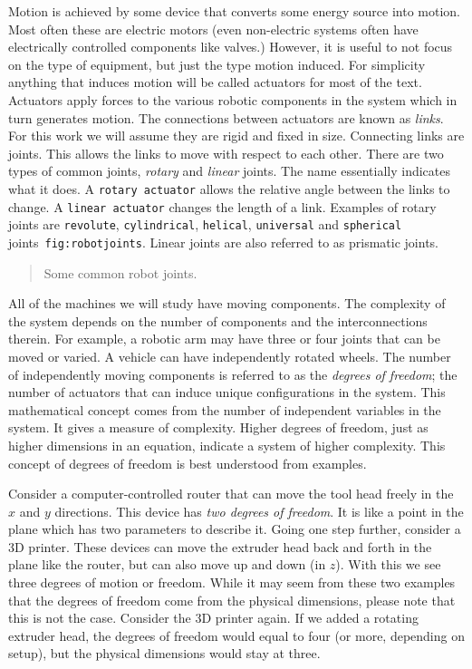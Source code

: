 Motion is achieved by some device that converts some energy source into
motion. Most often these are electric motors (even non-electric systems
often have electrically controlled components like valves.) However, it
is useful to not focus on the type of equipment, but just the type
motion induced. For simplicity anything that induces motion will be
called actuators for most of the text. Actuators apply forces to the
various robotic components in the system which in turn generates motion.
The connections between actuators are known as \emph{links}. For this
work we will assume they are rigid and fixed in size. Connecting links
are joints. This allows the links to move with respect to each other.
There are two types of common joints, \emph{rotary} and \emph{linear}
joints. The name essentially indicates what it does. A
\texttt{rotary\ actuator} allows the relative angle between the links to
change. A \texttt{linear\ actuator} changes the length of a link.
Examples of rotary joints are \texttt{revolute}, \texttt{cylindrical},
\texttt{helical}, \texttt{universal} and \texttt{spherical}
joints~\texttt{fig:robotjoints}. Linear joints are also referred to as
prismatic joints.

\begin{quote}
Some common robot joints.
\end{quote}

All of the machines we will study have moving components. The complexity
of the system depends on the number of components and the
interconnections therein. For example, a robotic arm may have three or
four joints that can be moved or varied. A vehicle can have
independently rotated wheels. The number of independently moving
components is referred to as the \emph{degrees of freedom}; the number
of actuators that can induce unique configurations in the system. This
mathematical concept comes from the number of independent variables in
the system. It gives a measure of complexity. Higher degrees of freedom,
just as higher dimensions in an equation, indicate a system of higher
complexity. This concept of degrees of freedom is best understood from
examples.

Consider a computer-controlled router that can move the tool head freely
in the \(x\) and \(y\) directions. This device has \emph{two degrees of
freedom}. It is like a point in the plane which has two parameters to
describe it. Going one step further, consider a 3D printer. These
devices can move the extruder head back and forth in the plane like the
router, but can also move up and down (in \(z\)). With this we see three
degrees of motion or freedom. While it may seem from these two examples
that the degrees of freedom come from the physical dimensions, please
note that this is not the case. Consider the 3D printer again. If we
added a rotating extruder head, the degrees of freedom would equal to
four (or more, depending on setup), but the physical dimensions would
stay at three.


